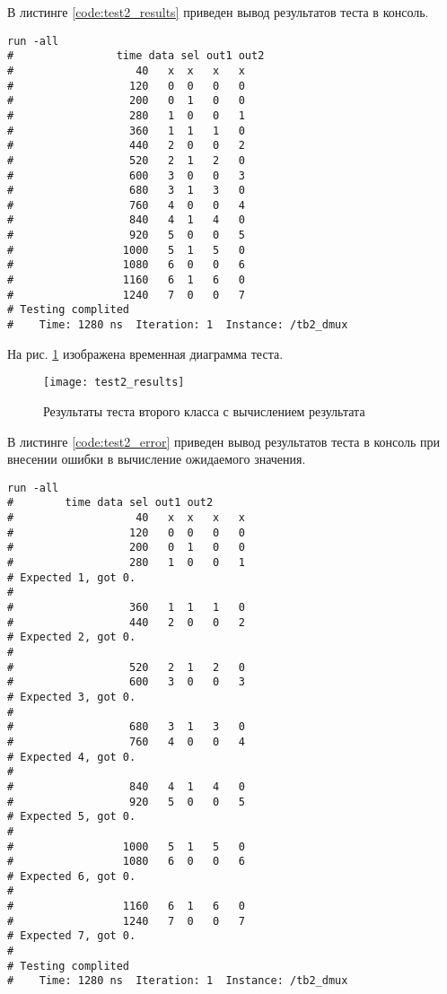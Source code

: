 В листинге \ref{code:test2_results} приведен вывод результатов теста в консоль.
\begin{lstlisting}[caption=Результаты теста второго класса с вычислением результата, label=code:test2_results, language={}]
run -all
# 		         time data sel out1 out2
#                   40   x  x   x   x
#                  120   0  0   0   0
#                  200   0  1   0   0
#                  280   1  0   0   1
#                  360   1  1   1   0
#                  440   2  0   0   2
#                  520   2  1   2   0
#                  600   3  0   0   3
#                  680   3  1   3   0
#                  760   4  0   0   4
#                  840   4  1   4   0
#                  920   5  0   0   5
#                 1000   5  1   5   0
#                 1080   6  0   0   6
#                 1160   6  1   6   0
#                 1240   7  0   0   7
# Testing complited
#    Time: 1280 ns  Iteration: 1  Instance: /tb2_dmux
\end{lstlisting}

На рис. \ref{fig:test2_results} изображена временная диаграмма теста.
\vspace{-0.5cm}
\begin{figure}[H]
	\begin{center}
		\texttt{[image: test2\_results]}
		\caption{Результаты теста второго класса с вычислением результата}
		\label{fig:test2_results}
	\end{center}
\end{figure}
\vspace{-1cm}

В листинге \ref{code:test2_error} приведен вывод результатов теста в консоль при внесении ошибки в вычисление ожидаемого значения.	
\begin{lstlisting}[caption=Результаты ошибочного теста второго класса с вычислением результата, label=code:test2_error, style=console]
run -all
# 		 time data sel out1 out2
#                   40   x  x   x   x
#                  120   0  0   0   0
#                  200   0  1   0   0
#                  280   1  0   0   1
# Expected 1, got 0.
# 
#                  360   1  1   1   0
#                  440   2  0   0   2
# Expected 2, got 0.
# 
#                  520   2  1   2   0
#                  600   3  0   0   3
# Expected 3, got 0.
# 
#                  680   3  1   3   0
#                  760   4  0   0   4
# Expected 4, got 0.
# 
#                  840   4  1   4   0
#                  920   5  0   0   5
# Expected 5, got 0.
# 
#                 1000   5  1   5   0
#                 1080   6  0   0   6
# Expected 6, got 0.
# 
#                 1160   6  1   6   0
#                 1240   7  0   0   7
# Expected 7, got 0.
# 
# Testing complited
#    Time: 1280 ns  Iteration: 1  Instance: /tb2_dmux
\end{lstlisting}
\vspace{-0.5cm}

